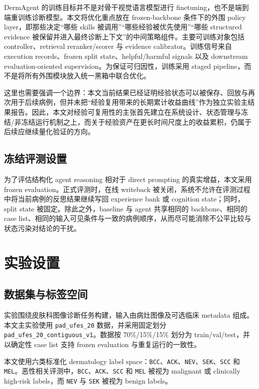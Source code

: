 \documentclass{article}
\begin{document}
DermAgent 的训练目标并不是对骨干视觉语言模型进行 finetuning，也不是端到端重训练诊断模型。本文将优化重点放在 frozen-backbone 条件下的外围 policy layer，即那些决定“哪些 skills 被调用”“哪些经验被优先使用”“哪些 structured evidence 被保留并进入最终诊断上下文”的中间策略组件。主要可训练对象包括 controller、retrieval reranker/scorer 与 evidence calibrator。训练信号来自 execution records、frozen split state、helpful/harmful signals 以及 downstream evaluation-oriented supervision。为保证可归因性，训练采用 staged pipeline，而不是将所有外围模块放入统一黑箱中联合优化。

这里也需要强调一个边界：本文当前结果已经证明经验状态可以被保存、回放与再次用于后续病例，但并未把“经验复用带来的长期累计收益曲线”作为独立实验主结果报告。因此，本文对经验可复用性的主张首先建立在系统设计、状态管理与冻结/非冻结运行机制之上，而关于经验资产在更长时间尺度上的收益累积，仍属于后续应继续量化验证的方向。

\subsection{冻结评测设置}

为了评估结构化 agent reasoning 相对于 direct prompting 的真实增益，本文采用 frozen evaluation。正式评测时，在线 writeback 被关闭，系统不允许在评测过程中将当前病例的反思结果继续写回 experience bank 或 cognition state；同时，split state 被固定。除此之外，baseline 与 agent 共享相同的 backbone、相同的 case list、相同的输入可见条件与一致的病例顺序，从而尽可能消除不公平比较与状态污染对结论的干扰。

\section{实验设置}

\subsection{数据集与标签空间}

实验围绕皮肤科图像诊断任务构建，输入由病灶图像及可选临床 metadata 组成。本文主实验使用 \texttt{pad\_ufes\_20} 数据，并采用固定划分 \texttt{pad\_ufes\_20\_contiguous\_v1}。数据按 70\%/15\%/15\% 划分为 train/val/test，并以确定性 case list 支持 frozen evaluation 与重复运行的一致性。

本文使用六类标准化 dermatology label space：\texttt{BCC}、\texttt{ACK}、\texttt{NEV}、\texttt{SEK}、\texttt{SCC} 和 \texttt{MEL}。恶性相关评测中，\texttt{BCC}、\texttt{ACK}、\texttt{SCC} 和 \texttt{MEL} 被视为 malignant 或 clinically high-risk labels，而 \texttt{NEV} 与 \texttt{SEK} 被视为 benign labels。
\end{document}
